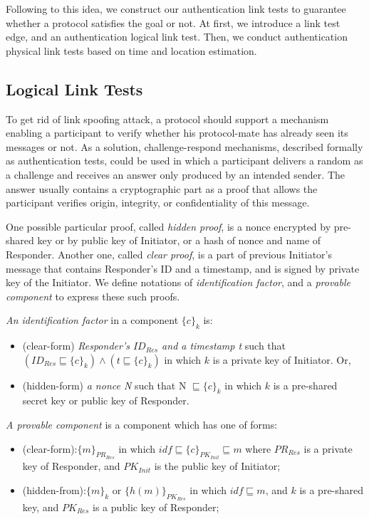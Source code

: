 Following to this idea, we construct our authentication link tests to guarantee whether a protocol satisfies the goal or not.  At first, we introduce a link test edge, and an authentication logical link test. Then, we conduct authentication physical link tests based on time and location estimation. 

\subsection{Logical Link Tests}

To get rid of link spoofing attack, a protocol should support a mechanism enabling a participant to verify whether his protocol-mate has already seen its messages or not. As a solution, challenge-respond mechanisms, described formally as authentication tests, could be used in which a participant delivers a random as a challenge and receives an answer only produced by an intended sender. The answer usually contains a cryptographic part as a proof that allows the participant verifies origin, integrity, or confidentiality of this message. 

One possible particular proof, called \textit{hidden proof}, is a nonce encrypted by pre-shared key or by public key of Initiator, or a hash of nonce and name of Responder. Another one, called \textit{clear proof}, is a part of previous Initiator's message that contains Responder's ID and a timestamp, and is signed by private key of the Initiator. We define notations of \emph{identification factor}, and a \emph{provable component} to express these such proofs. 

\begin{Definition} \emph{An identification factor} in a component $\{c\}_k$ is:
\begin{itemize}
	\item(clear-form) \emph{Responder's $ID_{Res}$ and a timestamp t} such that $(ID_{Res} \sqsubseteq \{c\}_k ) \wedge (t \sqsubseteq \{c\}_k)$ in which $k$ is a private key of Initiator. Or, 
	\item(hidden-form) \emph{a nonce N} such that N $\sqsubseteq \{c\}_k$ in which $k$ is a pre-shared secret key or public key of Responder.\end{itemize}
\end{Definition}

\begin{Definition}\emph{A provable component} is a component which has one of forms:
\begin{itemize}
	\item (clear-form):$\{m\}_{PR_{Res}}$ in which $idf \sqsubseteq \{c\}_{PK_{Init}} \sqsubseteq m$ where $PR_{Res}$ is a private key of Responder, and $PK_{Init}$ is the public key of Initiator;  
	\item (hidden-from):$\{m\}_k$ or $\{h(m)\}_{PK_{Res}}$ in which $idf \sqsubseteq m$, and $k$ is a pre-shared key, and $PK_{Res}$ is a public key of Responder;
\end{itemize}
\end{Definition}

